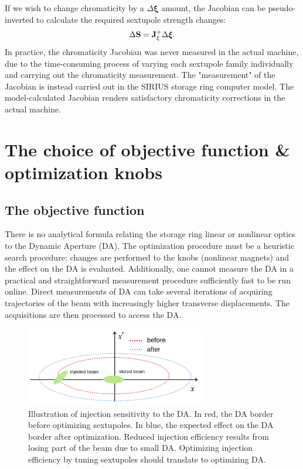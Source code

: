 If we wish to change chromaticity by a $\Delta\boldsymbol{\xi}$ amount, the Jacobian can be pseudo-inverted to calculate the required sextupole strength changes:
\begin{equation}
    \Delta \vb{S} = \vb{J}_{\xi}^{+}\Delta \boldsymbol{\xi}.
\end{equation}
In practice, the chromaticity Jacobian was never measured in the actual machine, due to the time-consuming process of varying each sextupole family individually and carrying out the chromaticity measurement. The "measurement" of the Jacobian is instead carried out in the SIRIUS storage ring computer model. The model-calculated Jacobian renders satisfactory chromaticity corrections in the actual machine.

\section{The choice of objective function \& optimization knobs}

\subsection{The objective function}
\label{subsec:objective_function}
There is no analytical formula relating the storage ring linear or nonlinear optics to the Dynamic Aperture (DA). The optimization procedure must be a heuristic search procedure: changes are performed to the knobs (nonlinear magnets) and the effect on the DA is evaluated. Additionally, one cannot measure the DA in a practical and straightforward measurement procedure sufficiently fast to be run online. Direct measurements of DA can take several iterations of acquiring trajectories of the beam with increasingly higher transverse displacements. The acquisitions are then processed to access the DA.

\begin{figure}
    \centering
    \includegraphics[width=0.7\textwidth]{Images/injection_illustration.png}
    \caption[Illustration of injection sensitivity to the DA]{Illustration of injection sensitivity to the DA. In red, the DA border before optimizing sextupoles. In blue, the expected effect on the DA border after optimization. Reduced injection efficiency results from losing part of the beam due to small DA. Optimizing injection efficiency by tuning sextupoles should translate to optimizing DA.}
\end{figure}

